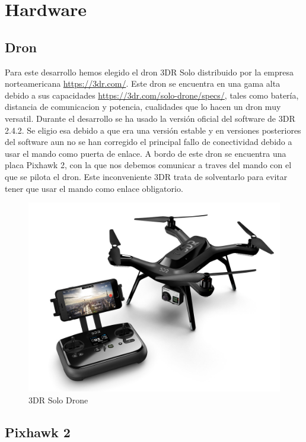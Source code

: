 \section{Hardware}
\label{sec:hardware}

\subsection{Dron}
Para este desarrollo hemos elegido el dron 3DR Solo distribuido por la empresa norteamericana \url{https://3dr.com/}. Este dron se encuentra en una gama alta debido a sus capacidades \url{https://3dr.com/solo-drone/specs/}, tales como batería, distancia de comunicacion y potencia, cualidades que lo hacen un dron muy versatil. Durante el desarrollo se ha usado la versión oficial del software de 3DR 2.4.2. Se eligio esa debido a que era una versión estable y en versiones posteriores del software aun no se han corregido el principal fallo de conectividad debido a usar el mando como puerta de enlace.
A bordo de este dron se encuentra una placa Pixhawk 2, con la que nos debemos comunicar a traves del mando con el que se pilota el dron. Este inconveniente 3DR trata de solventarlo para evitar tener que usar el mando como enlace obligatorio. 

\begin{figure}[H]
  \centering
  \includegraphics[scale=1]{imagenes/3drSoloDron.jpg}
  \caption{3DR Solo Drone}
  \label{fig:3drsolodrone}
\end{figure}


\cleardoublepage
\subsection{Pixhawk 2}

